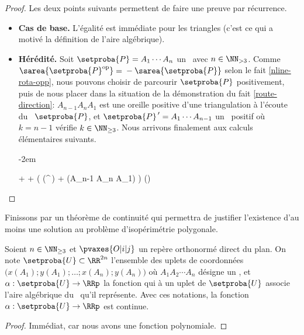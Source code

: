 \begin{proof}
    Les deux points suivants permettent de faire une preuve par récurrence.

    \begin{itemize}
		\item \textbf{Cas de base.}
		L'égalité est immédiate pour les triangles (c'est ce qui a motivé la définition de l'aire algébrique).


		\item \textbf{Hérédité.}
		Soit $\setproba{P} = A_1 \cdots A_n$ un \ngone\ avec $n \in \NN_{>3}$.
		Comme $\sarea{\setproba{P}^{\mathrm{op}}} = {} - \sarea{\setproba{P}}$ selon le fait \ref{nline-rota-opp}, nous pouvons choisir de parcourir $\setproba{P}$ positivement, puis de nous placer dans la situation de la démonstration du fait \ref{route-direction}:
		$A_{n-1} A_n A_1$ est une oreille positive d'une triangulation à l'écoute du \ngone\ $\setproba{P}$, et $\setproba{P}^{\,\prime} = A_1 \cdots A_{n-1}$ un \kgone\ positif où $k = n-1$ vérifie $k \in \NN_{\geq3}$.
		Nous arrivons finalement aux calculs élémentaires suivants.
		
		\leavevmode\kern-2em%
		\begin{stepcalc}[style=ar*]
		          {}
		     + 
		          {}
		      +  
		          {}
		     \big( \mu(^{\,\prime}) + \mu(A_{n-1} A_n A_1) \big)
		          {}
		     \mu()
		          {}
		     
		\explnext{}
		\end{stepcalc}
    \end{itemize}
    
    \null\vspace{-3.5ex}
\end{proof}




Finissons par un théorème de continuité qui permettra de justifier l'existence d'au moins une solution au problème d'isopérimétrie polygonale.


\begin{fact} \label{sarea-cont}
    Soient $n \in \NN_{\geq3}$ et
    $\pvaxes{O | i | j}$ un repère orthonormé direct du plan. 
    On note $\setproba{U} \subset \RR^{2n}$ l'ensemble des uplets de coordonnées $\big( x(A_1) ; y(A_1) ; \dots ; x(A_n) ; y(A_n) \big)$ où $A_1 A_2 \cdots A_n$ désigne un \ncycle,
    et $\alpha: \setproba{U} \rightarrow \RRp$ la fonction qui à un uplet de $\setproba{U}$ associe l'aire algébrique du \ncycle\ qu'il représente.
	Avec ces notations, la fonction $\alpha: \setproba{U} \rightarrow \RRp$ est continue.
\end{fact}


\begin{proof}
	Immédiat, car nous avons une fonction polynomiale.
\end{proof}
